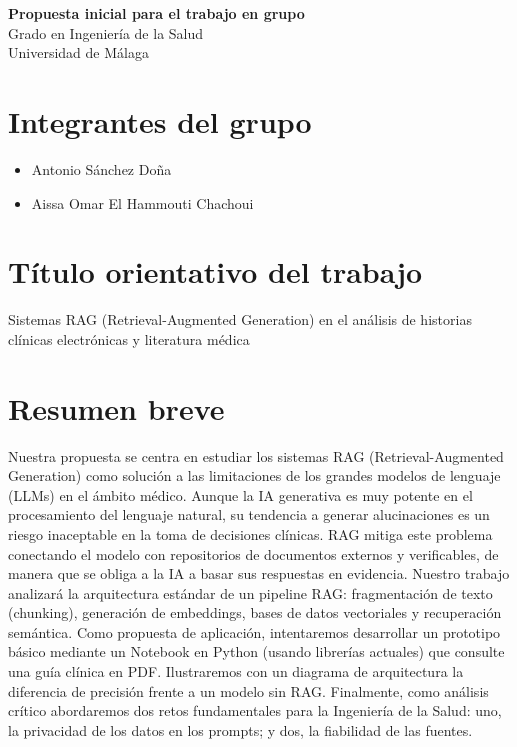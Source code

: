\documentclass[11pt,a4paper]{article}
\begin{document}
\vspace*{1cm} 
\begin{center}
    {\LARGE \textbf{Propuesta inicial para el trabajo en grupo}} \\[0.5cm]
    {\large Grado en Ingeniería de la Salud} \\
    {\large  Universidad de Málaga}
\end{center}

\vspace{1cm}

\section*{Integrantes del grupo}
\begin{itemize}
    \item Antonio Sánchez Doña
    \item Aissa Omar El Hammouti Chachoui
\end{itemize}

\vspace{0.5cm}

\section*{Título orientativo del trabajo}
Sistemas RAG (Retrieval-Augmented Generation) en el análisis de historias clínicas electrónicas y literatura médica

\vspace{0.5cm}

\section*{Resumen breve}
Nuestra propuesta se centra en estudiar los sistemas RAG (Retrieval-Augmented Generation) como solución a las limitaciones de los grandes modelos de lenguaje (LLMs) en el ámbito médico. Aunque la IA generativa es muy potente en el procesamiento del lenguaje natural, su tendencia a generar alucinaciones es un riesgo inaceptable en la toma de decisiones clínicas. RAG mitiga este problema conectando el modelo con repositorios de documentos externos y verificables, de manera que se obliga a la IA a basar sus respuestas en evidencia. Nuestro trabajo analizará la arquitectura estándar de un pipeline RAG: fragmentación de texto (chunking), generación de embeddings, bases de datos vectoriales y recuperación semántica. Como propuesta de aplicación, intentaremos desarrollar un prototipo básico mediante un Notebook en Python (usando librerías actuales) que consulte una guía clínica en PDF. Ilustraremos con un diagrama de arquitectura la diferencia de precisión frente a un modelo sin RAG. Finalmente, como análisis crítico abordaremos dos retos fundamentales para la Ingeniería de la Salud: uno, la privacidad de los datos en los prompts; y dos, la fiabilidad de las fuentes.
\end{document}
